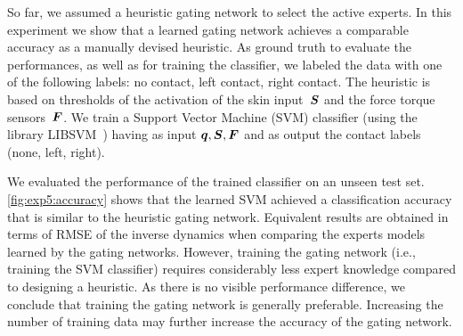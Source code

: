 	So far, we assumed a heuristic gating network to select the active experts.
	In this experiment we show that a learned gating network achieves a comparable accuracy as a manually devised heuristic.
    As ground truth to evaluate the performances, as well as for training the classifier, we labeled the data with one of the following labels: no contact, left contact, right contact.
    The heuristic is based on thresholds of the activation of the skin input~$\mathcal{\boldsymbol{S}}$ and the force torque sensors~$\boldsymbol{F}$.
	We train a Support Vector Machine (SVM) classifier (using the library LIBSVM~\cite{Chang2011}) having as input $\boldsymbol q, \mathcal{\boldsymbol{S}}, \boldsymbol{F}$ and as output the contact labels (none, left, right).

	We evaluated the performance of the trained classifier on an unseen test set.
	\fig\ref{fig:exp5:accuracy} shows that the learned SVM achieved a classification accuracy that is similar to the heuristic gating network. 
    Equivalent results are obtained in terms of RMSE of the inverse dynamics when comparing the experts models learned by the gating networks.
    However, training the gating network (i.e., training the SVM classifier) requires considerably less expert knowledge compared to designing a heuristic. 
    As there is no visible performance difference, we conclude that training the gating network is generally preferable.
Increasing the number of training data may further increase the accuracy of the gating network.




